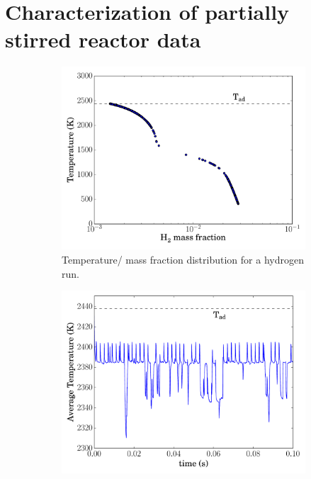 \documentclass[preprint,review,11pt]{elsarticle}
\begin{document}
\clearpage

\section{Characterization of partially stirred reactor data}

\setcounter{figure}{0}
\label{S:pasr_charac}
\begin{figure}[htbp]
  \centering
  \begin{subfigure}{0.48\textwidth}
      \includegraphics[width=\linewidth]{H2_pasr_dist.pdf}
      \caption{Temperature\slash {} mass fraction distribution for a hydrogen run.}
  \end{subfigure}
  \hfill
  \begin{subfigure}{0.48\textwidth}
      \includegraphics[width=\linewidth]{H2_pasr_tbar.pdf}

\end{subfigure}
\end{figure}
\end{document}
